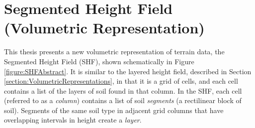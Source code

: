 % 



\section{Segmented Height Field (Volumetric Representation)}
\label{section:ErosionSimulationVolumetricTerrainRepresentation}

This thesis presents a new volumetric representation of terrain data, the Segmented Height Field (SHF), shown schematically in Figure \ref{figure:SHFAbstract}.  It is similar to the layered height field, described in Section \ref{section:VolumetricRepresentations}, in that it is a grid of cells, and each cell contains a list of the layers of soil found in that column. In the SHF, each cell (referred to as a \textit{column}) contains a list of soil \textit{segments} (a rectilinear block of soil).  Segments of the same soil type in adjacent grid columns that have overlapping intervals in height create a \textit{layer}.

